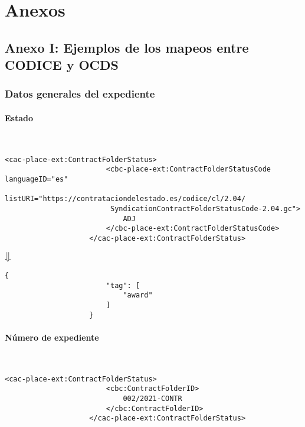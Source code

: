 \section{Anexos}

    \subsection{Anexo I: Ejemplos de los mapeos entre CODICE y OCDS}

        \subsubsection{Datos generales del expediente}
            \paragraph{Estado} \mbox{}\\
                \begin{lstlisting}[language=lXML]
                    <cac-place-ext:ContractFolderStatus>
                        <cbc-place-ext:ContractFolderStatusCode languageID="es"
                         listURI="https://contrataciondelestado.es/codice/cl/2.04/
                         SyndicationContractFolderStatusCode-2.04.gc">
                            ADJ
                        </cbc-place-ext:ContractFolderStatusCode>
                    </cac-place-ext:ContractFolderStatus>
                \end{lstlisting}
                
                \begin{center}
                    $\big\Downarrow$
                \end{center}
                
                \begin{lstlisting}[language=lJSON]
                    {
                        "tag": [
                            "award"
                        ]
                    }
                \end{lstlisting}
                
            \paragraph{Número de expediente} \mbox{}\\
                \begin{lstlisting}[language=lXML]
                    <cac-place-ext:ContractFolderStatus>
                        <cbc:ContractFolderID>
                            002/2021-CONTR
                        </cbc:ContractFolderID>
                    </cac-place-ext:ContractFolderStatus>
                \end{lstlisting}
                

